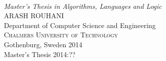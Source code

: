 \hypersetup{pageanchor=false} %
\begin{titlepage}

\mbox{}
\vfill
\addtolength{\voffset}{2cm}
\begin{flushleft}
	{ \\[0.5cm]
	\emph{\Large Master's Thesis in Algorithms, Languages and Logic} \\[.8cm]
	
	{\huge ARASH ROUHANI}\\[.8cm]
	
	{\Large Department of Computer Science and Engineering \\
	\textsc{Chalmers University of Technology} \\
	Gothenburg, Sweden 2014 \\
	Master's Thesis 2014:??\\
	} 
	}
\end{flushleft}

\end{titlepage}
\ClearShipoutPicture




